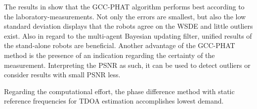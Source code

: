 The results in  show
that the \ac{GCC-PHAT} algorithm performs best according to the
laboratory-measurements.
Not only the errors are smallest, but also the low standard deviation
displays that the robots agree on the \ac{WSDE} and little outliers exist.
Also in regard to the multi-agent Bayesian updating filter, unified
results of the stand-alone robots are beneficial.
Another advantage of the \ac{GCC-PHAT} method is the presence of
an indication regarding the certainty of the measurement.
Interpreting the \ac{PSNR} as such, it can be used to detect outliers
or consider results with small \ac{PSNR} less.

Regarding the computational effort, the phase difference method
with static reference frequencies for \ac{TDOA} estimation
accomplishes lowest demand.


